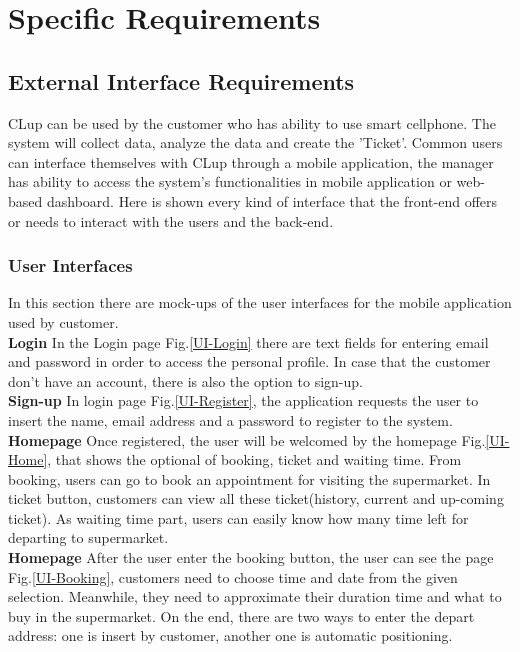 \documentclass[a4paper,12pt]{report}
\begin{document}
\chapter{Specific Requirements} \label{C3:SpecificRequirements}

\section{External Interface Requirements}
CLup can be used by the customer who has ability to use smart cellphone. The system will
collect data, analyze the data and create the 'Ticket'. Common users can interface themselves with CLup through a mobile application, the manager has ability to access the system’s functionalities in mobile application or web-based dashboard. Here is shown every kind of
interface that the front-end offers or needs to interact with the users and the back-end.
\subsection{User Interfaces}
In this section there are mock-ups of the user interfaces for the mobile application used
by customer.\\

\textbf{Login} In the Login page Fig.\ref{UI-Login} there are text fields for entering email and password in order to access the personal profile. In case that the customer don't have an account, there is also the option to sign-up.\\

\textbf{Sign-up} In login page Fig.\ref{UI-Register}, the application requests the user to insert the name, email address and a password to register to the system.\\

\textbf{Homepage} Once registered, the user will be welcomed by the homepage Fig.\ref{UI-Home}, that shows the optional of booking, ticket and waiting time. From booking, users can go to book an appointment for visiting the supermarket. In ticket button, customers can view all these ticket(history, current and up-coming ticket). As waiting time part, users can easily know how many time left for departing to supermarket.\\

\textbf{Homepage} After the user enter the booking button, the user can see the page Fig.\ref{UI-Booking}, customers need to choose time and date from the given selection. Meanwhile, they need to approximate their duration time and what to buy in the supermarket. On the end, there are two ways to enter the depart address: one is insert by customer, another one is automatic positioning.\\
\end{document}
